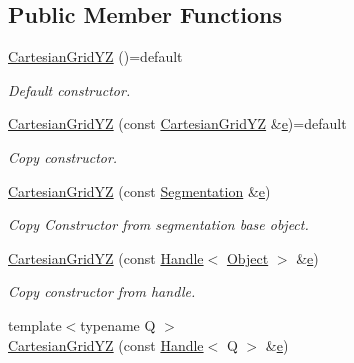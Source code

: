 \subsection*{Public Member Functions}
\begin{DoxyCompactItemize}
\item 
\hyperlink{class_d_d4hep_1_1_geometry_1_1_cartesian_grid_y_z_ad83e36071f68ad790a0a3b473e56bdd2}{Cartesian\+Grid\+YZ} ()=default
\begin{DoxyCompactList}\small\item\em Default constructor. \end{DoxyCompactList}\item 
\hyperlink{class_d_d4hep_1_1_geometry_1_1_cartesian_grid_y_z_a48afb91695647338e3117db8ee54ba4c}{Cartesian\+Grid\+YZ} (const \hyperlink{class_d_d4hep_1_1_geometry_1_1_cartesian_grid_y_z}{Cartesian\+Grid\+YZ} \&\hyperlink{_volumes_8cpp_a8a9a1f93e9b09afccaec215310e64142}{e})=default
\begin{DoxyCompactList}\small\item\em Copy constructor. \end{DoxyCompactList}\item 
\hyperlink{class_d_d4hep_1_1_geometry_1_1_cartesian_grid_y_z_ae3f9ea2435ad2c614ef57d1acd4bef8d}{Cartesian\+Grid\+YZ} (const \hyperlink{class_d_d4hep_1_1_geometry_1_1_segmentation}{Segmentation} \&\hyperlink{_volumes_8cpp_a8a9a1f93e9b09afccaec215310e64142}{e})
\begin{DoxyCompactList}\small\item\em Copy Constructor from segmentation base object. \end{DoxyCompactList}\item 
\hyperlink{class_d_d4hep_1_1_geometry_1_1_cartesian_grid_y_z_ab68e61e001c4eea7d4e6aa57dc7f99e4}{Cartesian\+Grid\+YZ} (const \hyperlink{class_d_d4hep_1_1_handle}{Handle}$<$ \hyperlink{class_d_d4hep_1_1_geometry_1_1_cartesian_grid_y_z_ad5db30e8623d30e9f23f0c4f8e0b546e}{Object} $>$ \&\hyperlink{_volumes_8cpp_a8a9a1f93e9b09afccaec215310e64142}{e})
\begin{DoxyCompactList}\small\item\em Copy constructor from handle. \end{DoxyCompactList}\item 
{\footnotesize template$<$typename Q $>$ }\\\hyperlink{class_d_d4hep_1_1_geometry_1_1_cartesian_grid_y_z_a1cf22d96f93e538d95b95d433b7179a3}{Cartesian\+Grid\+YZ} (const \hyperlink{class_d_d4hep_1_1_handle}{Handle}$<$ Q $>$ \&\hyperlink{_volumes_8cpp_a8a9a1f93e9b09afccaec215310e64142}{e})

\end{DoxyCompactItemize}
